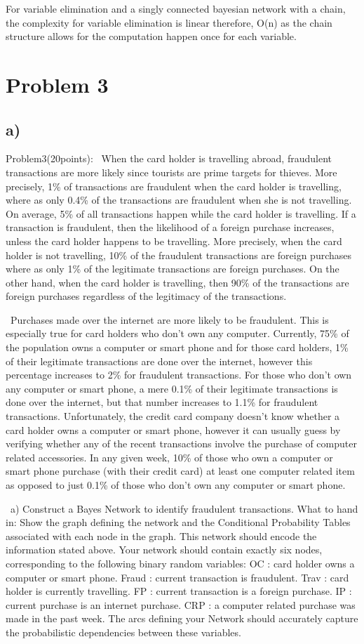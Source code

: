\documentclass{article}
\begin{document}
For variable elimination and a singly connected bayesian network with a chain, the complexity for variable elimination is linear therefore, O(n) as the chain structure allows for the computation happen once for each variable. 

\section{Problem 3}
\subsection{a)}
Problem3(20points):
\ When the card holder is travelling abroad, fraudulent transactions are more likely since tourists are prime targets for thieves. More precisely, 1\% of transactions are fraudulent when the card holder is travelling, where as only 0.4\% of the transactions are fraudulent when she is not travelling. On average, 5\% of all transactions happen while the card holder is travelling. If a transaction is fraudulent, then the likelihood of a foreign purchase increases, unless the card holder happens to be travelling. More precisely, when the card holder is not travelling, 10\% of the fraudulent transactions are foreign purchases where as only 1\% of the legitimate transactions are foreign purchases. On the other hand, when the card holder is travelling, then 90\% of the transactions are foreign purchases regardless of the legitimacy of the transactions.

\ Purchases made over the internet are more likely to be fraudulent. This is especially true for card holders who don’t own any computer. Currently, 75\% of the population owns a computer or smart phone and for those card holders, 1\% of their legitimate transactions are done over the internet, however this percentage increases to 2\% for fraudulent transactions. For those who don’t own any computer or smart phone, a mere 0.1\% of their legitimate transactions is done over the internet, but that number increases to 1.1\% for fraudulent transactions. Unfortunately, the credit card company doesn’t know whether a card holder owns a computer or smart phone, however it can usually guess by verifying whether any of the recent transactions involve the purchase of computer related accessories. In any given week, 10\% of those who own a computer or smart phone purchase (with their credit card) at least one computer related item as opposed to just 0.1\% of those who don’t own any computer or smart phone.

\ a) Construct a Bayes Network to identify fraudulent transactions.
What to hand in: Show the graph defining the network and the Conditional Probability Tables associated with each node in the graph. This network should encode the information stated above. Your network should contain exactly six nodes, corresponding to the following binary random variables:
OC : card holder owns a computer or smart phone.
Fraud : current transaction is fraudulent.
Trav : card holder is currently travelling.
FP : current transaction is a foreign purchase.
IP : current purchase is an internet purchase.
CRP : a computer related purchase was made in the past week.
The arcs defining your Network should accurately capture the probabilistic dependencies between these variables.
\end{document}
